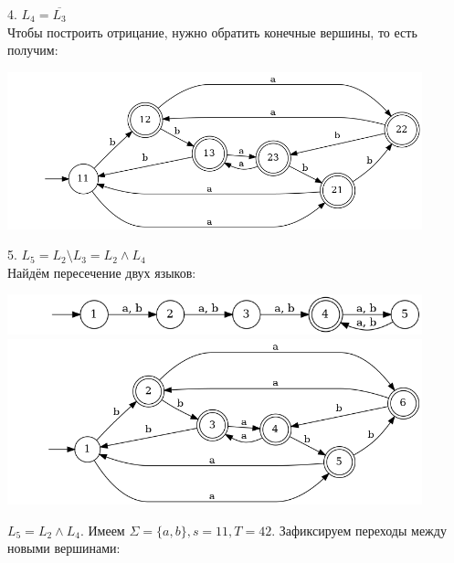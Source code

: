 \documentclass{article}
\begin{document}
    
    4. $L_4 = \overline{L_3}$\\
    Чтобы построить отрицание, нужно обратить конечные вершины, то есть получим:
    \begin{center}
        \includegraphics[width=0.9\textwidth]{pic16.dot}
    \end{center}
    
    5. $L_5 = L_2 \setminus L_3 = L_2 \wedge L_4 $\\
    Найдём пересечение двух языков:
    \begin{center}
        \includegraphics[width=0.9\textwidth]{pic2_5_1.dot}
        \includegraphics[width=0.9\textwidth]{pic2_5_2.dot}
    \end{center}
    $L_5 = L_2 \wedge L_4$. Имеем $\Sigma = \{a, b\}, s = 11, T = 42$. Зафиксируем переходы между новыми вершинами:
\end{document}
